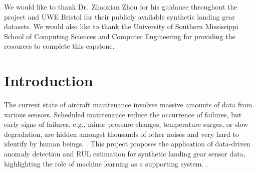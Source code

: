 \documentclass{CLS_zhou430}
\begin{document}
\frontmatter


\begin{abstract}
The project proposes the development of a system for anomaly detection and Remaining Useful Life (RUL) prediction for landing gear sensor data of aircraft. Six different anomaly detection algorithms, namely, Z-Score, Isolation Forest, K-Mean, DBSCAN, One-Class SVM, and LSTM Autoencoders, are implemented for six different synthetic Airbus datasets, consisting of 278,000 data points. An interactive dashboard using the Streamlit library facilitates the results for the maintenance crew. So far, the implementation of all the anomaly detection algorithms and the dashboard have been completed. Preliminary results indicate the feasibility of the Isolation Forest algorithm. Further, cross-validation of the results over different datasets, tuning of the parameters, and testing of the results remain to be done.
\end{abstract}


\begin{acknowledgments}
We would like to thank Dr.\ Zhaoxian Zhou for his guidance throughout the project and UWE Bristol for their publicly available synthetic landing gear datasets. We would also like to thank the University of Southern Mississippi School of Computing Sciences and Computer Engineering for providing the resources to complete this capstone.
\end{acknowledgments}

\makelists


\chapter{Introduction} \label{chap:intro}

The current state of aircraft maintenance involves massive amounts of data from various sensors. Scheduled maintenance reduce the occurrence of failures, but early signs of failures, e.g., minor pressure changes, temperature surges, or slow degradation, are hidden amongst thousands of other noises and very hard to identify by human beings. \cite{carvalho2019systematic, chandola2009anomaly}. This project proposes the application of data-driven anomaly detection and RUL estimation for synthetic landing gear sensor data, highlighting the role of machine learning as a supporting system. \cite{ran2019survey}.
\end{document}
